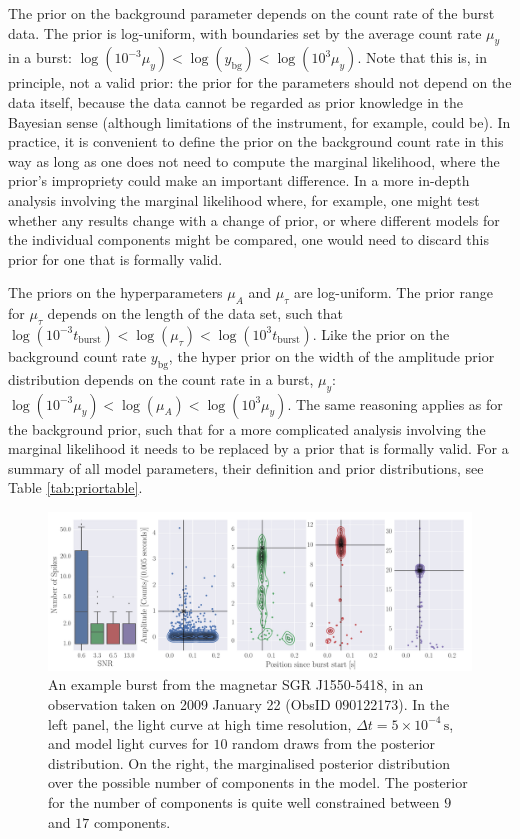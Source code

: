 \documentclass[12pt]{emulateapj}
\newcommand{\counts}{y}
\begin{document}
The prior on the background parameter depends on the count rate of the burst data. 
The prior is log-uniform, with boundaries set by the average count rate $\mu_\counts$ in a burst:
$\log{(10^{-3}\mu_\counts)} < \log{(\counts_{\mathrm{bg}})} < \log{(10^{3} \mu_\counts)}$. 
Note that this is, in principle, not a valid prior: the prior for the parameters should not depend on the data
itself, because the data cannot be regarded as prior knowledge in the Bayesian sense (although limitations of the instrument, for example,
could be). In practice, it is convenient to define the prior on the background count rate in this way as long as one does not need to compute the marginal likelihood,
where the prior's impropriety could make an important difference. 
In a more in-depth analysis involving the marginal likelihood where, for example, one might test whether any results change with a 
change of prior, or where different models for the individual components might be compared, one would need to discard this prior for one that is formally valid.

The priors on the hyperparameters $\mu_{A}$ and $\mu_{\tau}$ are log-uniform. The prior range for
$\mu_{\tau}$ depends on the length of the data set, such that $\log{(10^{-3}t_{\mathrm{burst}})} < \log{(\mu_{\tau})} < \log{(10^{3}t_\mathrm{burst})}$.
Like the prior on the background count rate $\counts_{\mathrm{bg}}$, the hyper prior on the width of the amplitude prior distribution
depends on the count rate in a burst, $\mu_\counts$: $\log{(10^{-3}\mu_\counts)} < \log{(\mu_{A})} < \log{(10^{3} \mu_\counts)}$. The same reasoning applies as
for the background prior, such that for a more complicated analysis involving the marginal likelihood it needs to be replaced
by a prior that is formally valid. For a summary of all model parameters, their definition and prior distributions, see Table
\ref{tab:priortable}.


\begin{figure}[htbp]
\includegraphics[width=\textwidth]{f3.pdf}%
\caption{An example burst from the magnetar SGR J1550-5418, in an observation taken on 2009 January 22 (ObsID 090122173). In the left
panel, the light curve at high time resolution, $\Delta t = 5 \times 10^{-4}\,\mathrm{s}$, and model light curves for $10$ random draws from the posterior distribution. 
On the right, the marginalised posterior distribution over the possible number of components in the model. The posterior for the number of components is 
quite well constrained between $9$ and $17$ components.}
\label{fig:dnest_example}
\end{figure}
\end{document}
